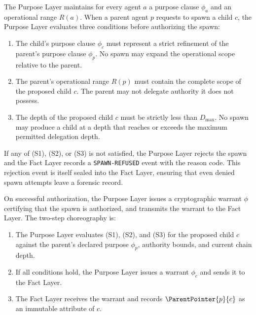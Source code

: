The Purpose Layer maintains for every agent $a$ a purpose clause $\phi_a$ and an operational range $R(a)$. When a parent agent $p$ requests to spawn a child $c$, the Purpose Layer evaluates three conditions before authorizing the spawn:

\begin{enumerate}
    \item[(S1) \textbf{Scope refinement:}] The child's purpose clause $\phi_c$ must represent a strict refinement of the parent's purpose clause $\phi_p$. No spawn may expand the operational scope relative to the parent.

    \item[(S2) \textbf{Authority sufficiency:}] The parent's operational range $R(p)$ must contain the complete scope of the proposed child $c$. The parent may not delegate authority it does not possess.

    \item[(S3) \textbf{Chain depth compliance:}] The depth of the proposed child $c$ must be strictly less than $D_{\max}$. No spawn may produce a child at a depth that reaches or exceeds the maximum permitted delegation depth.
\end{enumerate}

If any of (S1), (S2), or (S3) is not satisfied, the Purpose Layer rejects the spawn and the Fact Layer records a \texttt{SPAWN-REFUSED} event with the reason code. This rejection event is itself sealed into the Fact Layer, ensuring that even denied spawn attempts leave a forensic record.

On successful authorization, the Purpose Layer issues a cryptographic warrant $\phi$ certifying that the spawn is authorized, and transmits the warrant to the Fact Layer. The two-step choreography is:

\begin{enumerate}
    \item The Purpose Layer evaluates (S1), (S2), and (S3) for the proposed child $c$ against the parent's declared purpose $\phi_p$, authority bounds, and current chain depth.

    \item If all conditions hold, the Purpose Layer issues a warrant $\phi_c$ and sends it to the Fact Layer.

    \item The Fact Layer receives the warrant and records $\ParentPointer{p}{c}$ as an immutable attribute of $c$.
\end{enumerate}

